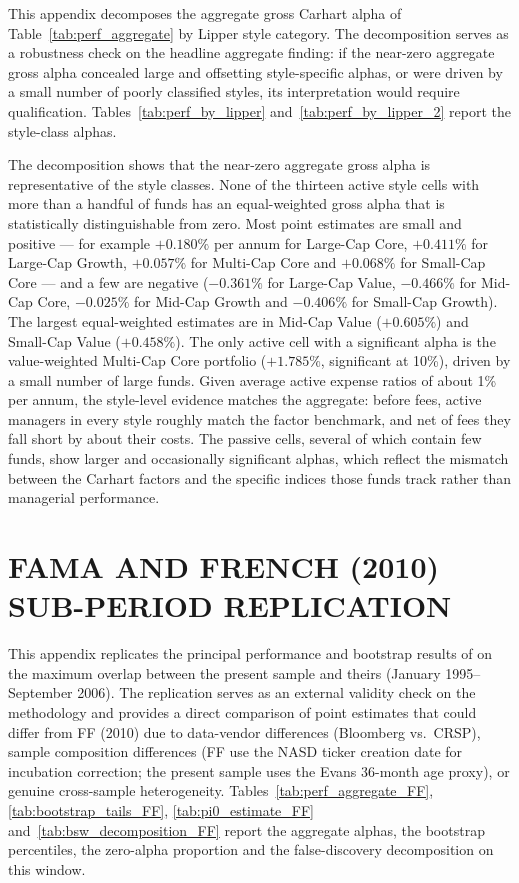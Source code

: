 \documentclass[12pt, oneside]{report}
\begin{document}
\noindent This appendix decomposes the aggregate gross Carhart alpha of
Table~\ref{tab:perf_aggregate} by Lipper style category. The
decomposition serves as a robustness check on the headline aggregate
finding: if the near-zero aggregate gross alpha concealed large and
offsetting style-specific alphas, or were driven by a small number of
poorly classified styles, its interpretation would require
qualification. Tables~\ref{tab:perf_by_lipper} and~\ref{tab:perf_by_lipper_2}
report the style-class alphas.



The decomposition shows that the near-zero aggregate gross alpha is
representative of the style classes. None of the thirteen active style
cells with more than a handful of funds has an equal-weighted gross alpha
that is statistically distinguishable from zero. Most point estimates are
small and positive --- for example $+0.180\%$ per annum for Large-Cap
Core, $+0.411\%$ for Large-Cap Growth, $+0.057\%$ for Multi-Cap Core and
$+0.068\%$ for Small-Cap Core --- and a few are negative
($-0.361\%$ for Large-Cap Value, $-0.466\%$ for Mid-Cap Core, $-0.025\%$
for Mid-Cap Growth and $-0.406\%$ for Small-Cap Growth). The largest equal-weighted estimates are in
Mid-Cap Value ($+0.605\%$) and Small-Cap Value ($+0.458\%$). The only
active cell with a significant alpha is the value-weighted Multi-Cap Core
portfolio ($+1.785\%$, significant at 10\%), driven by a small number of
large funds. Given average active expense ratios of about 1\% per annum,
the style-level evidence matches the aggregate: before fees, active
managers in every style roughly match the factor benchmark, and net of
fees they fall short by about their costs. The passive cells, several of
which contain few funds, show larger and occasionally significant
alphas, which reflect the mismatch between the Carhart factors and the
specific indices those funds track rather than managerial performance.

\chapter{FAMA AND FRENCH (2010) SUB-PERIOD REPLICATION}
\label{app:ff_replication}

\noindent This appendix replicates the principal performance and
bootstrap results of \textcite{FamaFrench2010} on the maximum
overlap between the present sample and theirs (January 1995--September
2006). The replication serves as an external validity check on the
methodology and provides a direct comparison of point estimates that
could differ from FF (2010) due to data-vendor differences (Bloomberg vs.\
CRSP), sample composition differences (FF use the
NASD ticker creation date for incubation correction; the present
sample uses the Evans 36-month age proxy), or genuine cross-sample
heterogeneity. Tables~\ref{tab:perf_aggregate_FF}, \ref{tab:bootstrap_tails_FF},
\ref{tab:pi0_estimate_FF} and~\ref{tab:bsw_decomposition_FF} report the
aggregate alphas, the bootstrap percentiles, the zero-alpha proportion and
the false-discovery decomposition on this window.
\end{document}
